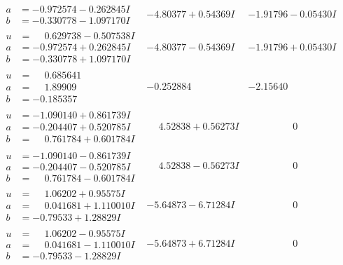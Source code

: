 \documentclass[1p]{elsarticle_modified}
\theoremstyle{definition}
\begin{document}
$$\begin{array}{c|c|c}
\begin{aligned}
a &= -0.972574 - 0.262845 I \\
b &= -0.330778 - 1.097170 I\end{aligned}
 & -4.80377 + 0.54369 I & -1.91796 - 0.05430 I \\ \hline\begin{aligned}
u &= \phantom{-}0.629738 - 0.507538 I \\
a &= -0.972574 + 0.262845 I \\
b &= -0.330778 + 1.097170 I\end{aligned}
 & -4.80377 - 0.54369 I & -1.91796 + 0.05430 I \\ \hline\begin{aligned}
u &= \phantom{-}0.685641\phantom{ +0.000000I} \\
a &= \phantom{-}1.89909\phantom{ +0.000000I} \\
b &= -0.185357\phantom{ +0.000000I}\end{aligned}
 & -0.252884\phantom{ +0.000000I} & -2.15640\phantom{ +0.000000I} \\ \hline\begin{aligned}
u &= -1.090140 + 0.861739 I \\
a &= -0.204407 + 0.520785 I \\
b &= \phantom{-}0.761784 + 0.601784 I\end{aligned}
 & \phantom{-}4.52838 + 0.56273 I & \phantom{-0.000000 } 0 \\ \hline\begin{aligned}
u &= -1.090140 - 0.861739 I \\
a &= -0.204407 - 0.520785 I \\
b &= \phantom{-}0.761784 - 0.601784 I\end{aligned}
 & \phantom{-}4.52838 - 0.56273 I & \phantom{-0.000000 } 0 \\ \hline\begin{aligned}
u &= \phantom{-}1.06202 + 0.95575 I \\
a &= \phantom{-}0.041681 + 1.110010 I \\
b &= -0.79533 + 1.28829 I\end{aligned}
 & -5.64873 - 6.71284 I & \phantom{-0.000000 } 0 \\ \hline\begin{aligned}
u &= \phantom{-}1.06202 - 0.95575 I \\
a &= \phantom{-}0.041681 - 1.110010 I \\
b &= -0.79533 - 1.28829 I\end{aligned}
 & -5.64873 + 6.71284 I & \phantom{-0.000000 } 0 \\ \hline\begin{aligned}

\end{aligned}
\end{array}$$
\end{document}
